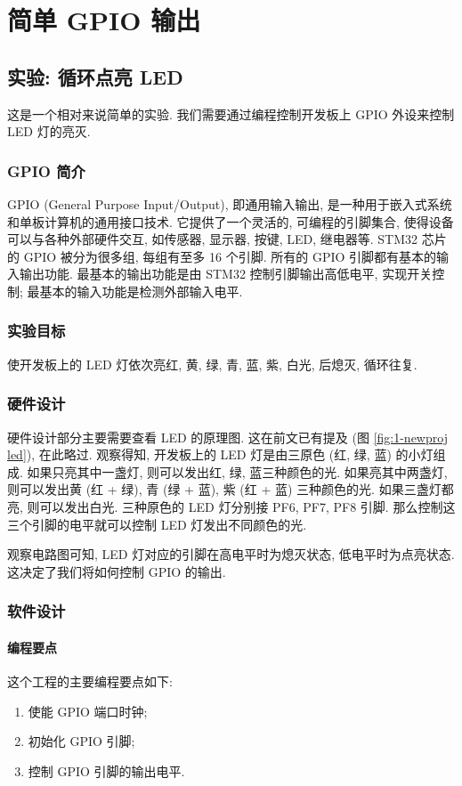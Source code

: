 \part{简单 GPIO 输出}
\chapter{实验: 循环点亮 LED}
这是一个相对来说简单的实验. 我们需要通过编程控制开发板上 GPIO 外设来控制 LED 灯的亮灭.

\section{GPIO 简介}
GPIO (General Purpose Input/Output), 即通用输入输出, 是一种用于嵌入式系统和单板计算机的通用接口技术. 它提供了一个灵活的, 可编程的引脚集合, 使得设备可以与各种外部硬件交互, 如传感器, 显示器, 按键, LED, 继电器等. STM32 芯片的 GPIO 被分为很多组, 每组有至多 16 个引脚. 所有的 GPIO 引脚都有基本的输入输出功能. 最基本的输出功能是由 STM32 控制引脚输出高低电平, 实现开关控制; 最基本的输入功能是检测外部输入电平.

\section{实验目标}
使开发板上的 LED 灯依次亮红, 黄, 绿, 青, 蓝, 紫, 白光, 后熄灭, 循环往复.

\section{硬件设计}
硬件设计部分主要需要查看 LED 的原理图. 这在前文已有提及 (图 \ref{fig:1-newproj led}), 在此略过. 观察得知, 开发板上的 LED 灯是由三原色 (红, 绿, 蓝) 的小灯组成. 如果只亮其中一盏灯, 则可以发出红, 绿, 蓝三种颜色的光. 如果亮其中两盏灯, 则可以发出黄 (红 + 绿), 青 (绿 + 蓝), 紫 (红 + 蓝) 三种颜色的光. 如果三盏灯都亮, 则可以发出白光. 三种原色的 LED 灯分别接 PF6, PF7, PF8 引脚. 那么控制这三个引脚的电平就可以控制 LED 灯发出不同颜色的光.

观察电路图可知, LED 灯对应的引脚在高电平时为熄灭状态, 低电平时为点亮状态. 这决定了我们将如何控制 GPIO 的输出.

\section{软件设计}
\subsection{编程要点}
这个工程的主要编程要点如下:
\begin{enumerate}[(1)]
    \item 使能 GPIO 端口时钟;
    \item 初始化 GPIO 引脚;
    \item 控制 GPIO 引脚的输出电平.
\end{enumerate}

